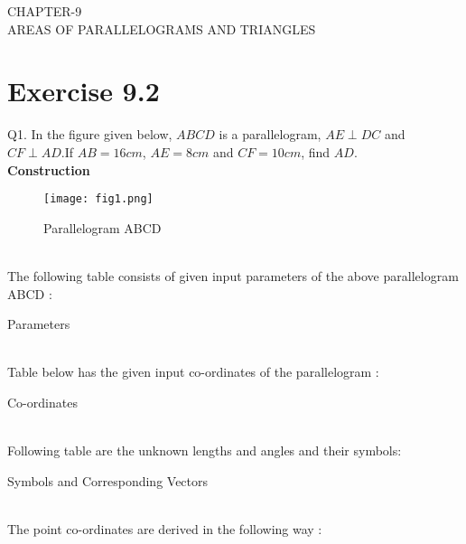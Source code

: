 \documentclass{article}
\begin{document}
\begin{center}
        \textbf\large{CHAPTER-9 \\ AREAS OF PARALLELOGRAMS AND TRIANGLES}
\end{center}
\section{Exercise 9.2}
Q1. In the figure given below, $ABCD$ is a parallelogram, $AE \perp DC$ and $CF \perp AD$.If $AB = 16cm$, $AE = 8cm$ and $CF = 10cm$, find $AD$.\\
\textbf{Construction}\\
\begin{figure}[h]
 \begin{center}
  \texttt{[image: fig1.png]}
 \end{center}
 \caption{Parallelogram ABCD}
 \label{fig:Fig}
\end{figure}\\
\pagebreak
The following table consists of given input parameters of the above parallelogram ABCD :\\
\begin{table}[h]
\centering
	
	\caption{Parameters}
	\label{tab:table1}
\end{table}\\
Table below has the given input co-ordinates of the parallelogram :\\
\begin{table}[h]
	\centering
	
	\caption{Co-ordinates}
	\label{tab:table2}
\end{table}\\
Following table are the unknown lengths and angles and their symbols: \\
\begin{table}[h]
	\centering
	
	\caption{Symbols and Corresponding Vectors}
	\label{tab:table3}
\end{table}\\
The point co-ordinates are derived in the following way : \\
\end{document}
